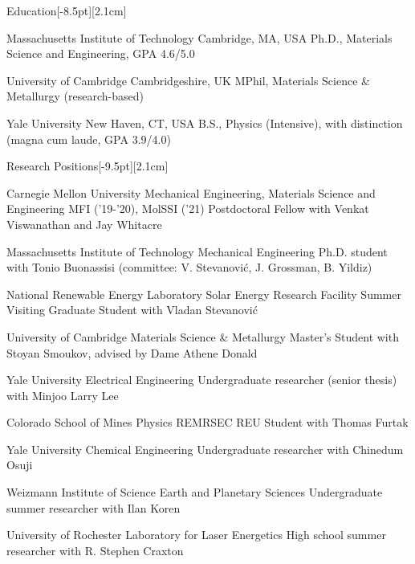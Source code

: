 \documentclass{cv} %
\begin{document}
\thispagestyle{empty}
\begin{cvSection}{Education}[-8.5pt][2.1cm]

     {Massachusetts Institute of Technology}
     {Cambridge, MA, USA}
     {Ph.D., Materials Science and Engineering, GPA 4.6/5.0}

     {University of Cambridge}
     {Cambridgeshire, UK}
     {MPhil, Materials Science \& Metallurgy (research-based)}

     {Yale University}
     {New Haven, CT, USA}
     {B.S., Physics (Intensive), with distinction (magna cum laude, GPA 3.9/4.0)}


\end{cvSection}

\begin{cvSection}{Research Positions}[-9.5pt][2.1cm]

    {Carnegie Mellon University}
    {Mechanical Engineering, Materials Science and Engineering}
    {MFI ('19-'20), MolSSI ('21) Postdoctoral Fellow with Venkat Viswanathan and Jay Whitacre}

    {Massachusetts Institute of Technology}
    {Mechanical Engineering}
    {Ph.D. student with Tonio Buonassisi (committee: V. Stevanovi\'c, J. Grossman, B. Yildiz)}

    {National Renewable Energy Laboratory}
    {Solar Energy Research Facility}
    {Summer Visiting Graduate Student with Vladan Stevanovi\'c}

    {University of Cambridge}
    {Materials Science \& Metallurgy}
    {Master's Student with Stoyan Smoukov, advised by Dame Athene Donald}

    {Yale University}
    {Electrical Engineering}
    {Undergraduate researcher (senior thesis) with Minjoo Larry Lee}

    {Colorado School of Mines}
    {Physics}
    {REMRSEC REU Student with Thomas Furtak}

    {Yale University}
    {Chemical Engineering}
    {Undergraduate researcher with Chinedum Osuji}

    {Weizmann Institute of Science}
    {Earth and Planetary Sciences}
    {Undergraduate summer researcher with Ilan Koren}

    {University of Rochester}
    {Laboratory for Laser Energetics}
    {High school summer researcher with R. Stephen Craxton}

\end{cvSection}
\end{document}
